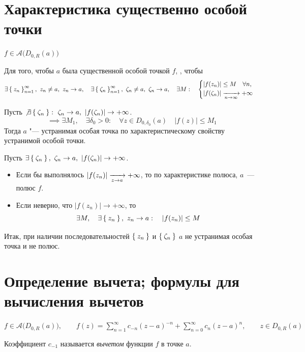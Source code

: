 \section{Характеристика существенно особой точки}

\begin{theorem}
	$ f \in \mathcal A \big( D_{0, R}(a) \big) $

	Для того, чтобы $ a $ была существенной особой точкой $ f $, , чтобы
	$$ \exists \Set{z_n}_{n=1}^{\infty}, ~ z_n \ne a, ~ z_n \to a, \quad \exists \Set{\zeta_n}_{n=1}^{\infty}, ~ \zeta_n \ne a, ~ \zeta_n \to a, \quad \exists M : \quad
	\begin{cases}
		|f(z_n)| \le M \quad \forall n, \\
		|f(\zeta_n)| \xrightarrow[n \to \infty]{} +\infty
	\end{cases} $$
\end{theorem}

\begin{iproof}
	\item Пусть $ \not\exists \Set{\zeta_n} : ~ \zeta_n \to a, ~ |f(\zeta_n)| \to +\infty $.
	$$ \implies \exists M_1, \quad \exists \delta_0 > 0 : \quad \forall z \in D_{0, \delta_0}(a) \quad |f(z)| \le M_1 $$
	Тогда $ a $ "--- устранимая особая точка по характеристическому свойству устранимой особой точки.

	\item Пусть $ \exists \Set{\zeta_n}, ~ \zeta_n \to a, ~ |f(\zeta_n)| \to +\infty $.
	\begin{itemize}
		\item Если бы выполнялось $ |f(z_n)| \xrightarrow[z \to a]{} +\infty $, то по характеристике полюса, $ a $~--- полюс $ f $.
		\item Если неверно, что $ |f(z_n)| \to +\infty $, то
		$$ \exists M, \quad \exists \Set{z_n}, ~ z_n \to a : \quad |f(z_n)| \le M $$
	\end{itemize}

	Итак, при наличии последовательностей $ \Set{z_n} $ и $ \Set{\zeta_n} $ $ a $ не устранимая особая точка и не полюс.
\end{iproof}

\section{Определение вычета; формулы для вычисления вычетов}

\begin{definition}
	$ f \in \mathcal A(D_{0, R}(a) \big), \qquad f(z) = \sum_{n = 1}^\infty c_{-n}(z - a)^{-n} + \sum_{n = 0}^\infty c_n(z - a)^n, \qquad z \in D_{0, R}(a) $

	Коэффициент $ c_{-1} $ называется \emph{вычетом} функции $ f $ в точке $ a $.
\end{definition}

